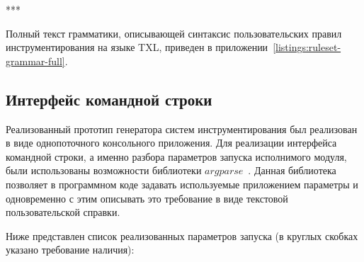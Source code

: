 ***

Полный текст грамматики, описывающей синтаксис пользовательских правил инструментирования на языке TXL, приведен в приложении~\ref{listings:ruleset-grammar-full}.

\subsection{Интерфейс командной строки}

Реализованный прототип генератора систем инструментирования был реализован в виде однопоточного консольного приложения.
Для реализации интерфейса командной строки, а именно разбора параметров запуска исполнимого модуля, были использованы возможности библиотеки $argparse$~\cite{argparse}.
Данная библиотека позволяет в программном коде задавать используемые приложением параметры и одновременно с этим описывать это требование в виде текстовой пользовательской справки.

Ниже представлен список реализованных параметров запуска (в круглых скобках указано требование наличия):

